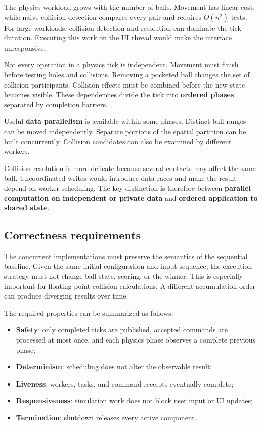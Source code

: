 The physics workload grows with the number of balls.
Movement has linear cost, while naive collision detection compares every pair and requires $O(n^2)$ tests.
For large workloads, collision detection and resolution can dominate the tick duration.
Executing this work on the UI thread would make the interface unresponsive.

Not every operation in a physics tick is independent.
Movement must finish before testing holes and collisions.
Removing a pocketed ball changes the set of collision participants.
Collision effects must be combined before the new state becomes visible.
These dependencies divide the tick into \textbf{ordered phases} separated by completion barriers.

Useful \textbf{data parallelism} is available within some phases.
Distinct ball ranges can be moved independently.
Separate portions of the spatial partition can be built concurrently.
Collision candidates can also be examined by different workers.

Collision resolution is more delicate because several contacts may affect the same ball.
Uncoordinated writes would introduce data races and make the result depend on worker scheduling.
The key distinction is therefore between \textbf{parallel computation on independent or private data} and \textbf{ordered application to shared state}.

\subsection{Correctness requirements}

The concurrent implementations must preserve the semantics of the sequential baseline.
Given the same initial configuration and input sequence, the execution strategy must not change ball state, scoring, or the winner.
This is especially important for floating-point collision calculations.
A different accumulation order can produce diverging results over time.

The required properties can be summarized as follows:

\begin{itemize}
    \item \textbf{Safety}: only completed ticks are published, accepted commands are processed at most once, and each physics phase observes a complete previous phase;
    \item \textbf{Determinism}: scheduling does not alter the observable result;
    \item \textbf{Liveness}: workers, tasks, and command receipts eventually complete;
    \item \textbf{Responsiveness}: simulation work does not block user input or UI updates;
    \item \textbf{Termination}: shutdown releases every active component.
\end{itemize}

